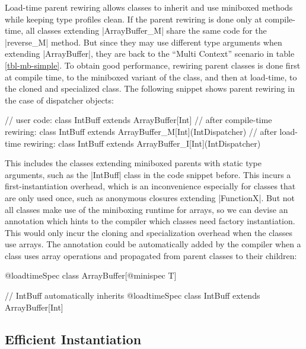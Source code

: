 Load-time parent rewiring allows classes to inherit and use miniboxed methods while keeping type profiles clean. If the parent rewiring is done only at compile-time, all classes extending |ArrayBuffer_M| share the same code for the |reverse_M| method. But since they may use different type arguments when extending |ArrayBuffer|, they are back to the ``Multi Context'' scenario in table \ref{tbl-mb-simple}. To obtain good performance, rewiring parent classes is done first at compile time, to the miniboxed variant of the class, and then at load-time, to the cloned and specialized class. The following snippet shows parent rewiring in the case of dispatcher objects:  

\begin{lstlisting-nobreak}
 // user code:
 class IntBuff extends ArrayBuffer[Int]
 // after compile-time rewiring:
 class IntBuff extends ArrayBuffer_M[Int](IntDispatcher)
 // after load-time rewiring:
 class IntBuff extends ArrayBuffer_I[Int](IntDispatcher)
\end{lstlisting-nobreak}     

 This includes the classes extending miniboxed parents with static type arguments, such as the |IntBuff| class in the code snippet before. This incurs a first-instantiation overhead, which is an inconvenience especially for classes that are only used once, such as anonymous closures extending |FunctionX|. But not all classes make use of the miniboxing runtime for arrays, so we can devise an annotation which hints to the compiler which classes need factory instantiation. This would only incur the cloning and specialization overhead when the classes use arrays. The annotation could be automatically added by the compiler when a class uses array operations and propagated from parent classes to their children:

\begin{lstlisting-nobreak}
 @loadtimeSpec
 class ArrayBuffer[@minispec T] 

 // IntBuff automatically inherits @loadtimeSpec 
 class IntBuff extends ArrayBuffer[Int]
\end{lstlisting-nobreak}     
    
\subsection{Efficient Instantiation}
\label{subsec-runtime-instantiation}

